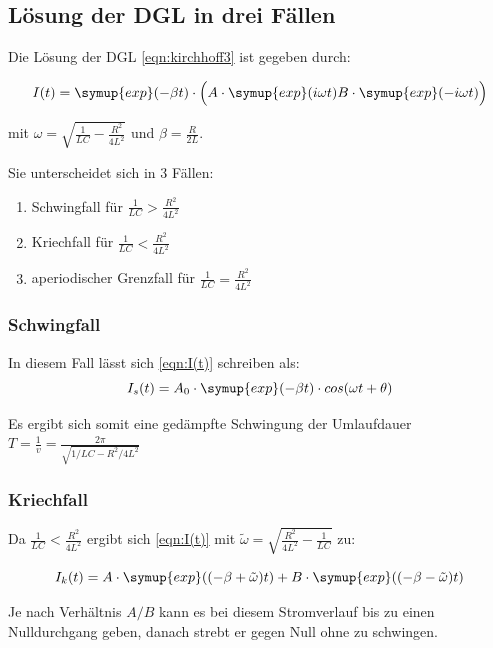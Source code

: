 \subsection{Lösung der DGL in drei Fällen}

Die Lösung der DGL \eqref{eqn:kirchhoff3} ist gegeben durch:

\begin{equation}
  I(t) = \symup{exp}(-\beta t) \cdot \Bigl( A \cdot \symup{exp}(i \omega t) B \cdot \symup{exp}(-i \omega t) \Bigr)
  \label{eqn:I(t)}
\end{equation}

mit $\omega = \sqrt{\frac{1}{LC} - \frac{R^2}{4L^2}}$ und $\beta = \frac{R}{2L}$.

Sie unterscheidet sich in 3 Fällen:

\begin{enumerate}
  \item Schwingfall für $\frac{1}{LC} > \frac{R^2}{4L^2}$
  \item Kriechfall für $\frac{1}{LC} < \frac{R^2}{4L^2}$
  \item aperiodischer Grenzfall für $\frac{1}{LC} = \frac{R^2}{4L^2}$
\end{enumerate}

\subsubsection{Schwingfall}
In diesem Fall lässt sich \eqref{eqn:I(t)} schreiben als:
\begin{equation}
  I_s(t)= A_0 \cdot \symup{exp}(-\beta t) \cdot cos(\omega t + \theta)
  \label{eqn:Schwing(t)}
\end{equation}

Es ergibt sich somit eine gedämpfte Schwingung der Umlaufdauer $T= \frac{1}{v} = \frac{2\pi}{\sqrt{1/LC-R^2/4L^2}}$

\subsubsection{Kriechfall}
Da $\frac{1}{LC} < \frac{R^2}{4L^2}$ ergibt sich \eqref{eqn:I(t)}  mit $\tilde{\omega} = \sqrt{\frac{R^2}{4L^2} - \frac{1}{LC}}$ zu:

\begin{equation}
  I_k(t) = A \cdot \symup{exp}((-\beta + \tilde{\omega}) t) + B \cdot \symup{exp}((-\beta - \tilde{\omega}) t)
  \label{eqn:Kriech(t)}
\end{equation}

Je nach Verhältnis $A/B$ kann es bei diesem Stromverlauf bis zu einen Nulldurchgang geben, danach strebt er gegen Null ohne zu schwingen.


